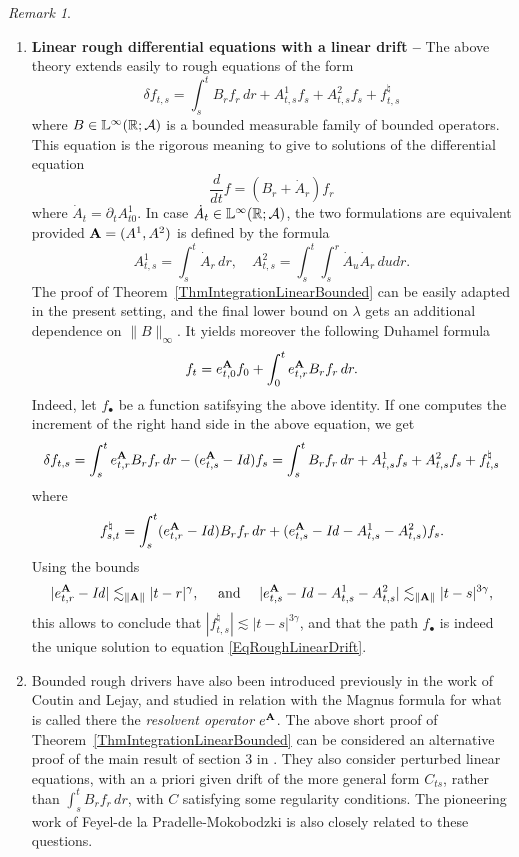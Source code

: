 \documentclass[11pt,a4paper]{amsart}
\newcommand{\RR}{\mathbb{R}}  \newcommand{\CC}{\mathbb{C}}  \newcommand{\LL}{\mathbb{L}}  \newcommand{\WW}{\mathbb{W}}
\theoremstyle{plain}%
\theoremstyle{definition}
\theoremstyle{remark}
\newtheorem{remark}[theorem]{Remark}
\numberwithin{equation}{section} %
\begin{document}
\begin{remark}
\begin{enumerate}
   \item {\bf Linear rough differential equations with a linear drift -- } The above theory extends easily to rough equations of the form
\begin{equation}
\label{EqRoughLinearDrift}
\delta f_{t, s} = \int_s^t B_r f_r\,dr + A^1_{t, s} f_s + A^2_{t, s} f_s + f^{\natural}_{t, s}
\end{equation}
where $B \in \LL^{\infty} (\RR; \mcA)$ is a bounded measurable family of bounded operators. This equation is the rigorous meaning to give to solutions of the differential equation
$$
\frac{d}{dt} f = (B_r + \dot{A}_r) f_r
$$
where $\dot{A}_t = \partial_t A_{t0}^1$. In case $\dot{A}_t \in \LL^{\infty} (\RR; \mcA)$, the two formulations are equivalent provided ${\bf A} = (A^1, A^2)$ is defined by the formula
$$ 
A^1_{t, s} = \int_s^t \dot{A}_r \,dr, \quad A^2_{t, s} = \int_s^t \int_s^r \dot{A}_u \dot{A}_r \,du dr.
$$
The proof of Theorem~\ref{ThmIntegrationLinearBounded} can be easily adapted in the present setting, and the final lower bound on $\lambda$ gets an additional dependence on $\| B \|_\infty$. It yields moreover the following Duhamel formula
$$
f_t = e^{\bf A}_{t, 0} f_0 + \int_0^t e^{\bf A}_{t, r} B_r f_r\,dr.
$$
Indeed, let $f_\bullet$ be a function satifsying the above identity. If one computes the increment of the right hand side in the above equation, we get
$$
\delta f_{t, s} = \int_s^t e^{\bf A}_{t, r} B_r f_r \,dr - (e^{\bf A}_{t, s} -\textrm{\emph{Id}}) f_s = \int_s^t B_r f_r \,dr + A^1_{t, s} f_s + A^2_{t, s} f_s + f^\natural_{t, s}
$$
where
$$
f^\natural_{s, t} = \int_s^t (e^{\bf A}_{t, r} -\textrm{\emph{Id}}) B_r f_r \,dr + (e^{\bf A}_{t, s} -\textrm{\emph{Id}} - A^1_{t, s} - A^2_{t, s}) f_s.
$$
Using the bounds
$$
| e^{\bf A}_{t, r} -\textrm{\emph{Id}}| \lesssim_{\|{\bf A}\|} | t -  r |^{\gamma}, \quad \textrm{ and }\quad  | e^{\bf A}_{t, s}  -\textrm{\emph{Id}} - A^1_{t, s} - A^2_{t, s} | \lesssim_{\| {\bf A} \|} | t - s |^{3 \gamma},
$$
this allows to conclude that $|f^{\natural}_{t, s}| \lesssim | t - s |^{3\gamma}$, and that the path $f_\bullet$ is indeed the unique solution to equation \eqref{EqRoughLinearDrift}. \vspace{0.2cm}

   \item Bounded rough drivers have also been introduced previously in the work \cite{CoutinLejayLinear} of Coutin and Lejay, and studied in relation with the Magnus formula for what is called there the \emph{resolvent operator} $e^{\bf A}$. The above short proof of Theorem~\ref{ThmIntegrationLinearBounded} can be considered an alternative proof of the main result of section 3 in \cite{CoutinLejayLinear}. They also consider perturbed linear equations, with an a priori given drift of the more general form $C_{ts}$, rather than $\int_s^t B_rf_r\,dr$, with $C$ satisfying some regularity conditions. The pioneering work \cite{FdlPM} of Feyel-de la Pradelle-Mokobodzki is also closely related to these questions.
\end{enumerate}
\end{remark}
\end{document}
